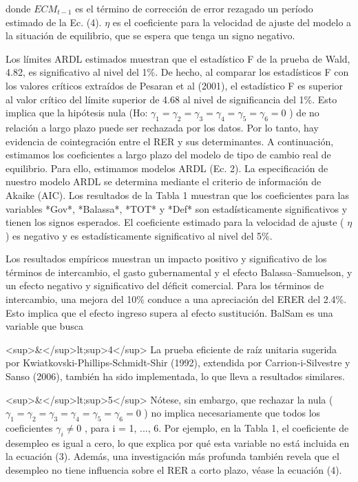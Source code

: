 \documentclass[11pt,a4paper]{article}
\begin{document}
donde $ECM_{t-1}$ es el término de corrección de error rezagado un período estimado de la Ec. (4). $\eta$ es el coeficiente para la velocidad de ajuste del modelo a la situación de equilibrio, que se espera que tenga un signo negativo.

Los límites ARDL estimados muestran que el estadístico F de la prueba de Wald, 4.82, es significativo al nivel del 1\%. De hecho, al comparar los estadísticos F con los valores críticos extraídos de Pesaran et al (2001), el estadístico F es superior al valor crítico del límite superior de 4.68 al nivel de significancia del 1\%. Esto implica que la hipótesis nula (Ho: $\gamma_1 = \gamma_2 = \gamma_3 = \gamma_4 = \gamma_5 = \gamma_6 = 0$ ) de no relación a largo plazo puede ser rechazada por los datos. Por lo tanto, hay evidencia de cointegración entre el RER y sus determinantes. A continuación, estimamos los coeficientes a largo plazo del modelo de tipo de cambio real de equilibrio. Para ello, estimamos modelos ARDL (Ec. 2). La especificación de nuestro modelo ARDL se determina mediante el criterio de información de Akaike (AIC). Los resultados de la Tabla 1 muestran que los coeficientes para las variables *Gov*, *Balassa*, *TOT* y *Def* son estadísticamente significativos y tienen los signos esperados. El coeficiente estimado para la velocidad de ajuste ( $\eta$ ) es negativo y es estadísticamente significativo al nivel del 5\%.

Los resultados empíricos muestran un impacto positivo y significativo de los términos de intercambio, el gasto gubernamental y el efecto Balassa–Samuelson, y un efecto negativo y significativo del déficit comercial. Para los términos de intercambio, una mejora del 10\% conduce a una apreciación del ERER del 2.4\%. Esto implica que el efecto ingreso supera al efecto sustitución. BalSam es una variable que busca

<sup>&</sup>lt;sup>4</sup> La prueba eficiente de raíz unitaria sugerida por Kwiatkovski-Phillips-Schmidt-Shir (1992), extendida por Carrion-i-Silvestre y Sanso (2006), también ha sido implementada, lo que lleva a resultados similares.

<sup>&</sup>lt;sup>5</sup> Nótese, sin embargo, que rechazar la nula ( $\gamma_1 = \gamma_2 = \gamma_3 = \gamma_4 = \gamma_5 = \gamma_6 = 0$ ) no implica necesariamente que todos los coeficientes $\gamma_i \neq 0$ , para i = 1, ..., 6. Por ejemplo, en la Tabla 1, el coeficiente de desempleo es igual a cero, lo que explica por qué esta variable no está incluida en la ecuación (3). Además, una investigación más profunda también revela que el desempleo no tiene influencia sobre el RER a corto plazo, véase la ecuación (4).
\end{document}
